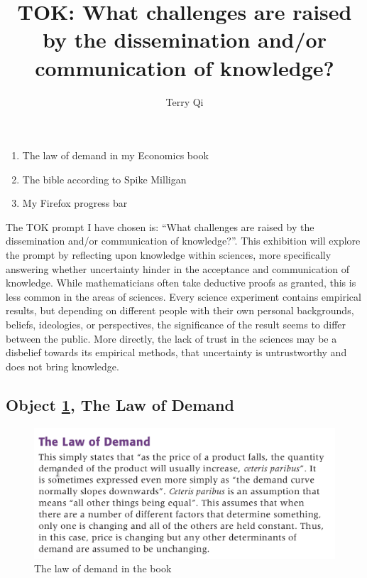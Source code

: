 \documentclass[a4paper,12pt]{article}
\title{TOK: What challenges are raised by the dissemination and/or communication of knowledge?}
\author{Terry Qi}
\begin{document}
\maketitle
\begin{enumerate}
 \item The law of demand in my Economics book
 \item The bible according to Spike Milligan
 \item My Firefox progress bar
\end{enumerate}

\newpage



The TOK prompt I have chosen is: ``What challenges are raised by the dissemination and/or communication of knowledge?''. This exhibition will explore the prompt by reflecting upon knowledge within sciences, more specifically answering whether uncertainty hinder in the acceptance and communication of knowledge. While mathematicians often take deductive proofs as granted, this is less common in the areas of sciences. Every science experiment contains empirical results, but depending on different people with their own personal backgrounds, beliefs, ideologies, or perspectives, the significance of the result seems to differ between the public. More directly, the lack of trust in the sciences may be a disbelief towards its empirical methods, that uncertainty is untrustworthy and does not bring knowledge.


\subsection*{Object \ref{fig:lod}, The Law of Demand}

\begin{figure}[h!]
 \centering
 \includegraphics[scale=0.25]{ecobook.png}
 \caption{The law of demand in the book}
 \label{fig:lod}
\end{figure}
\end{document}
